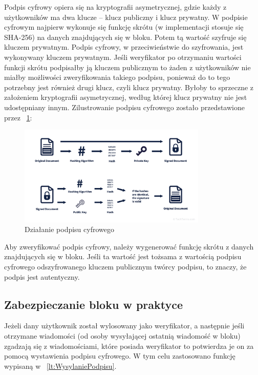 Podpis cyfrowy opiera się na kryptografii asymetrycznej, gdzie każdy z użytkowników ma dwa klucze – klucz publiczny i klucz prywatny. W podpisie cyfrowym najpierw wykonuje się funkcję skrótu (w implementacji stosuje się SHA-256) na danych znajdujących się w bloku. Potem tą wartość szyfruje się kluczem prywatnym. Podpis cyfrowy, w przeciwieństwie do szyfrowania, jest wykonywany kluczem prywatnym. Jeśli weryfikator po otrzymaniu wartości funkcji skrótu podpisałby ją kluczem publicznym to żaden z użytkowników nie miałby możliwości zweryfikowania takiego podpisu, ponieważ do to tego potrzebny jest również drugi klucz, czyli klucz prywatny. Byłoby to sprzeczne z założeniem kryptografii asymetrycznej, według której klucz prywatny nie jest udostępniany innym.
Zilustrowanie podpisu cyfrowego zostało przedstawione przez \figurename{~\ref{fig:DSJP}}:
\clearpage
\begin{figure}[ht]
    \centering
    \includegraphics[width=0.8\textwidth]{Images/DSJPG.jpg}
    \caption{Działanie podpisu cyfrowego}
    \label{fig:DSJP}
\end{figure}

Aby zweryfikować podpis cyfrowy, należy wygenerować funkcję skrótu z danych znajdujących się w bloku. Jeśli ta wartość jest tożsama z wartością podpisu cyfrowego odszyfrowanego kluczem publicznym twórcy podpisu, to znaczy, że podpis jest autentyczny.

\subsection{Zabezpieczanie bloku w praktyce}
\label{ssec:ZabezpieczenieBlokuPraktyka}

Jeżeli dany użytkownik został wylosowany jako weryfikator, a następnie jeśli otrzymane wiadomości (od osoby wysyłającej ostatnią wiadomość w bloku) zgadzają się z wiadomościami, które posiada weryfikator to potwierdza je on za pomocą wystawienia podpisu cyfrowego. W tym celu zastosowano funkcję wypisaną w \lstlistingname{~\ref{lt:WysylaniePodpisu}}.

